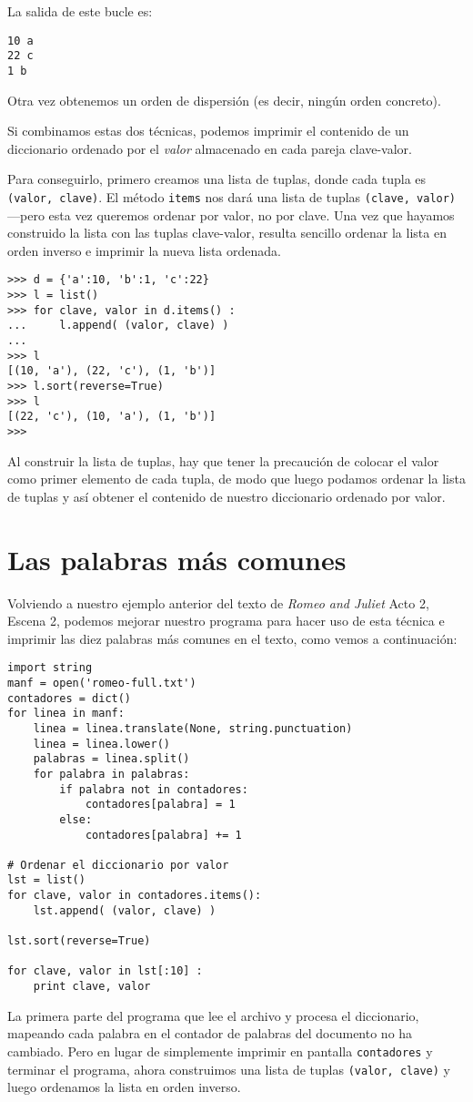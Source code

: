 La salida de este bucle es:

\beforeverb
\begin{verbatim}
10 a
22 c
1 b
\end{verbatim}
\afterverb
%
Otra vez obtenemos un orden de dispersión (es decir, ningún orden concreto).

Si combinamos estas dos técnicas, podemos imprimir el contenido
de un diccionario ordenado por el \emph{valor} almacenado en cada pareja
clave-valor.

Para conseguirlo, primero creamos una lista de tuplas, donde cada tupla es
{\tt (valor, clave)}. El método {\tt items} nos dará una lista de
tuplas {\tt (clave, valor)}---pero esta vez queremos ordenar por valor, no
por clave. Una vez que hayamos construido la lista con las tuplas clave-valor,
resulta sencillo ordenar la lista en orden inverso e imprimir la nueva lista ordenada.

\beforeverb
\begin{verbatim}
>>> d = {'a':10, 'b':1, 'c':22}
>>> l = list()
>>> for clave, valor in d.items() :
...     l.append( (valor, clave) )
... 
>>> l
[(10, 'a'), (22, 'c'), (1, 'b')]
>>> l.sort(reverse=True)
>>> l
[(22, 'c'), (10, 'a'), (1, 'b')]
>>> 
\end{verbatim}
\afterverb
%
Al construir la lista de tuplas, hay que tener la precaución de colocar el valor
como primer elemento de cada tupla, de modo que luego podamos ordenar la lista de tuplas
y así obtener el contenido de nuestro diccionario ordenado por valor.

\section{Las palabras más comunes}

Volviendo a nuestro ejemplo anterior del texto de \emph{Romeo and Juliet}
Acto 2, Escena 2, podemos mejorar nuestro programa para hacer uso de esta técnica e
imprimir las diez palabras más comunes en el texto, como vemos a continuación:

\beforeverb
\begin{verbatim}
import string
manf = open('romeo-full.txt')
contadores = dict()
for linea in manf:
    linea = linea.translate(None, string.punctuation)
    linea = linea.lower()
    palabras = linea.split()
    for palabra in palabras:
        if palabra not in contadores:
            contadores[palabra] = 1
        else:
            contadores[palabra] += 1

# Ordenar el diccionario por valor
lst = list()
for clave, valor in contadores.items():
    lst.append( (valor, clave) )

lst.sort(reverse=True)

for clave, valor in lst[:10] :
    print clave, valor
\end{verbatim}
\afterverb
%
La primera parte del programa que lee el archivo y procesa
el diccionario, mapeando cada palabra en el contador de palabras del
documento no ha cambiado. Pero en lugar de simplemente imprimir en pantalla
{\tt contadores} y terminar el programa, ahora construimos una
lista de tuplas {\tt (valor, clave)} y luego ordenamos la lista en orden inverso.

